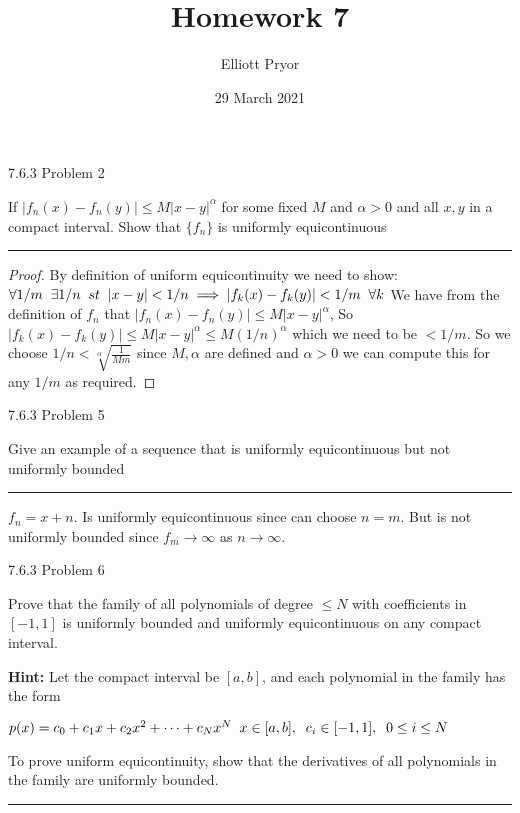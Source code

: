 \documentclass[11pt]{article}
\title{Homework 7}
\author{Elliott Pryor}
\date{29 March 2021}
\begin{document}
\maketitle

 7.6.3 Problem 2

If $|f_n(x) - f_n(y)| \leq M |x - y|^\alpha$ for some fixed $M$ and $\alpha > 0$
and all $x,y$ in a compact interval. Show that $\{f_n\}$ is uniformly
equicontinuous

\hrule

\begin{proof}
    
    By definition of uniform equicontinuity we need to show:
    $\forall 1/m \sp \exists 1/n \sp st \sp |x - y| < 1/n \implies |f_k(x) - f_k(y)| < 1/m \sp \forall k$
    We have from the definition of $f_n$ that $|f_n(x) - f_n(y)| \leq M |x - y|^\alpha$,
    So $|f_k(x) - f_k(y)| \leq M |x - y|^\alpha \leq M (1/n)^\alpha$ which we need to be $< 1/m$.
    So we choose $1/n < \sqrt[\alpha]{\frac{1}{Mm}}$ since $M, \alpha$ are defined and $\alpha > 0$
    we can compute this for any $1/m$ as required.
\end{proof}



 7.6.3 Problem 5

Give an example of a sequence that is uniformly equicontinuous 
but not uniformly bounded

\hrule

$f_n = x + n$. Is uniformly equicontinuous since can choose $n = m$. But is not uniformly bounded
since $f_m \to \infty$ as $n \to \infty$.




 7.6.3 Problem 6

Prove that the family of all polynomials of degree $\leq N$ with
coefficients in $[-1,1]$ is uniformly bounded and uniformly
equicontinuous on any compact interval. 

\textbf{Hint: }
Let the compact interval be $[a, b]$, and each polynomial in the family has the form

$p(x) = c_0 + c_1 x + c_2 x^2 + \dots + c_N x^N \sp x \in [a,b], \sp c_i \in [-1, 1], \sp 0 \leq i \leq N$

To prove uniform equicontinuity, show that the derivatives of all polynomials in the 
family are uniformly bounded.

\hrule
\end{document}
